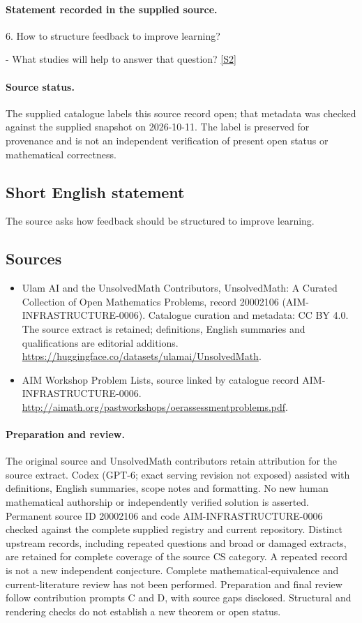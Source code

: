 \documentclass[11pt]{article}
\begin{document}
\paragraph{Statement recorded in the supplied source.}
6. How to structure feedback to improve learning?

- What studies will help to answer that question? \href{http://aimath.org/pastworkshops/oerassessmentproblems.pdf}{[S2]}
\paragraph{Source status.}
The supplied catalogue labels this source record open; that metadata was checked against the supplied snapshot on 2026-10-11. The label is preserved for provenance and is not an independent verification of present open status or mathematical correctness.
\subsection{Short English statement}
The source asks how feedback should be structured to improve learning.
\subsection{Sources}
\begin{itemize}
\item[S1] Ulam AI and the UnsolvedMath Contributors, UnsolvedMath: A Curated Collection of Open Mathematics Problems, record 20002106 (AIM-INFRASTRUCTURE-0006). Catalogue curation and metadata: CC BY 4.0. The source extract is retained; definitions, English summaries and qualifications are editorial additions.
\url{https://huggingface.co/datasets/ulamai/UnsolvedMath}.
\item[S2] AIM Workshop Problem Lists, source linked by catalogue record AIM-INFRASTRUCTURE-0006.
\url{http://aimath.org/pastworkshops/oerassessmentproblems.pdf}.
\end{itemize}
\paragraph{Preparation and review.}
The original source and UnsolvedMath contributors retain attribution for the source extract. Codex (GPT-6; exact serving revision not exposed) assisted with definitions, English summaries, scope notes and formatting. No new human mathematical authorship or independently verified solution is asserted. Permanent source ID 20002106 and code AIM-INFRASTRUCTURE-0006 checked against the complete supplied registry and current repository. Distinct upstream records, including repeated questions and broad or damaged extracts, are retained for complete coverage of the source CS category. A repeated record is not a new independent conjecture. Complete mathematical-equivalence and current-literature review has not been performed. Preparation and final review follow contribution prompts C and D, with source gaps disclosed. Structural and rendering checks do not establish a new theorem or open status.
\label{end:20002106}
\end{document}
